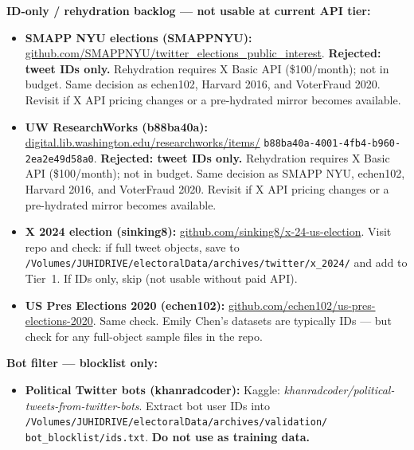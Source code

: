 \documentclass[11pt]{article}
\begin{document}
\begin{taskbox}
{  \smallskip
  \textbf{ID-only / rehydration backlog --- not usable at current API tier:}
  \begin{itemize}[leftmargin=1.6em, itemsep=1pt]
    \item \textbf{SMAPP NYU elections (SMAPPNYU):}
          \url{github.com/SMAPPNYU/twitter_elections_public_interest}.
          \textbf{Rejected: tweet IDs only.} Rehydration requires X Basic API
          (\$100/month); not in budget. Same decision as echen102, Harvard
          2016, and VoterFraud 2020. Revisit if X API pricing changes or a
          pre-hydrated mirror becomes available.
    \item \textbf{UW ResearchWorks (b88ba40a):}
          \url{digital.lib.washington.edu/researchworks/items/}\allowbreak
          \texttt{b88ba40a-4001-4fb4-b960-2ea2e49d58a0}.
          \textbf{Rejected: tweet IDs only.} Rehydration requires X Basic API
          (\$100/month); not in budget. Same decision as SMAPP NYU, echen102,
          Harvard 2016, and VoterFraud 2020. Revisit if X API pricing changes
          or a pre-hydrated mirror becomes available.
    \item \textbf{X 2024 election (sinking8):}
          \url{github.com/sinking8/x-24-us-election}.
          Visit repo and check: if full tweet objects, save to
          \texttt{/Volumes/JUHIDRIVE/electoralData/archives/twitter/x\_2024/}
          and add to Tier~1.
          If IDs only, skip (not usable without paid API).
    \item \textbf{US Pres Elections 2020 (echen102):}
          \url{github.com/echen102/us-pres-elections-2020}.
          Same check. Emily Chen's datasets are typically IDs --- but
          check for any full-object sample files in the repo.
  \end{itemize}

  \smallskip
  \textbf{Bot filter --- blocklist only:}
  \begin{itemize}[leftmargin=1.6em, itemsep=1pt]
    \item \textbf{Political Twitter bots (khanradcoder):}
          Kaggle: \textit{khanradcoder/political-tweets-from-twitter-bots}.
          Extract bot user IDs into
          \texttt{/Volumes/JUHIDRIVE/electoralData/archives/validation/}\allowbreak
          \texttt{bot\_blocklist/ids.txt}.
          \textbf{Do not use as training data.}
  \end{itemize}

}
\end{taskbox}
\end{document}
